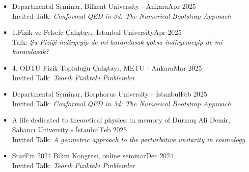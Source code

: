\documentclass[a4paper,11pt]{article}
\begin{document}
\begin{itemize}[itemsep=.001em]
\item[] Departmental Seminar, Bilkent University - Ankara\hfill Apr 2025
\\
\hspace*{1.8em}Invited Talk: \emph{Conformal QED in 3d: The Numerical Bootstrap Approach}

\item[] 1.Fizik ve Felsefe Çalıştayı, İstanbul University\hfill Apr 2025
\\
\hspace*{1.8em}Talk: \emph{Şu Fiziği indirgeyip de mi kuramlasak yoksa indirgemeyip de mi kuramlasak?}

\item[] 4. ODTÜ Fizik Topluluğu Çalıştayı, METU - Ankara\hfill Mar 2025
\\
\hspace*{1.8em}Invited Talk: \emph{Teorik Fizikteki Problemler}

\item[] Departmental Seminar, Bosphorus University - İstanbul\hfill Feb 2025
\\
\hspace*{1.8em}Invited Talk: \emph{Conformal QED in 3d: The Numerical Bootstrap Approach}

\item[] A life dedicated to theoretical physics: in memory of Durmuş Ali Demir, Sabancı University - İstanbul\hfill Feb 2025
\\
\hspace*{1.8em}Invited Talk: \emph{A geometric approach to the perturbative unitarity in cosmology}

\item[] StarFin 2024 Bilim Kongresi, online seminar\hfill Dec 2024
\\
\hspace*{1.8em}Invited Talk: \emph{Teorik Fizikteki Problemler}


\end{itemize}
\end{document}
